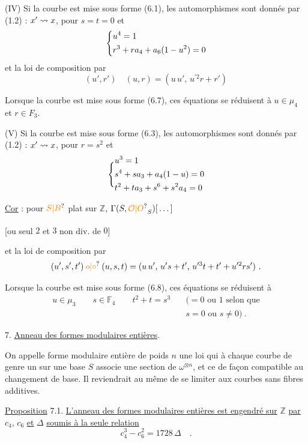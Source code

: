(IV) Si la courbe est mise sous forme (6.1), les automorphismes sont donnés par (1.2) : $x'\rightsquigarrow x$, pour $s=t=0$ et
\[
\Bigg\{\begin{aligned}
&u^4=1\\
&r^3+ra_4+a_6(1-u^2)=0
\end{aligned}
\]
et la loi de composition par
\[
(u',r')\quad(u,r)=(u\,u',\,u^{\prime 2}r+r')
\]

Lorsque la courbe est mise sous forme (6.7), ces équations se réduisent à $u\in\mu_4$ et $r\in F_3$.

(V) Si la courbe est mise sous forme (6.3), les automorphismes sont donnés par (1.2) : $x'\rightsquigarrow x$, pour $r=s^2$ et
\[
\Bigg\{\begin{aligned}
&u^3=1\\
&s^4+sa_3+a_4(1-u)=0\\
&t^2+ta_3+s^6+s^2a_4=0
\end{aligned}
\]


\uline{Cor} : pour $\unsure{S|B}$ plat sur $\mathbb{Z}$, $\Gamma(S,\unsure{\mathcal{O}|O}_S)[\,\ldots\,]$

[ou seul\textsuperscript{\uline{}} $2$ et $3$ non div. de $0$]


et la loi de composition par
\[
(u',s',t')\mathbin{\unsure{o|\circ}}(u,s,t)=(u\,u',\,u's+t',\,u^{\prime 3}t+t'+u^{\prime 2}rs')\ .
\]

Lorsque la courbe est mise sous forme (6.8), ces équations se réduisent à
\[
\begin{aligned}
u\in\mu_3\qquad s\in\mathbb{F}_4\qquad t^2+t=s^3\quad &(=0\text{ ou }1\text{ selon que}\\
&s=0\text{ ou }s\ne0)\ .
\end{aligned}
\]

7. \uline{Anneau des formes modulaires entières}.

On appelle forme modulaire entière de poids $n$ une loi qui à chaque courbe de genre un sur une base $S$ associe une section de $\omega^{\otimes n}$, et ce de façon compatible au changement de base. Il reviendrait au même de se limiter aux courbes sans fibres additives.

\uline{Proposition} 7.1. \uline{L'anneau des formes modulaires entières est engendré sur} $\mathbb{Z}$ \uline{par} $c_4$, $c_6$ \uline{et} $\Delta$ \uline{soumis à la seule relation}
\[
c_4^3-c_6^2=1728\,\Delta\quad.\tag*{(7.2.)}
\]

